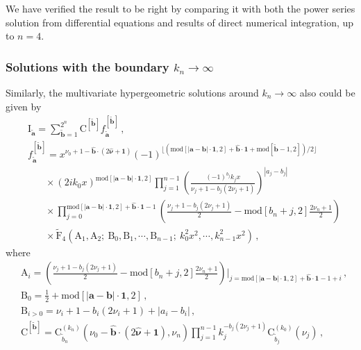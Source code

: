 \documentclass[a4paper,11pt]{article}
\newcommand{\nn}{\nonumber}
\begin{document}
We have verified the result to be right by comparing it with both the power series solution from differential equations and results of direct numerical integration, up to $n=4$.





\subsubsection{Solutions with the boundary $k_n\to\infty$}


Similarly, the multivariate hypergeometric solutions around $k_n\to \infty$ also could be given by
\begin{align}
&\text{I}_{\tilde{\bm{a}}}= \sum_{\tilde{\bm{b}}=1}^{2^n} \text{C}^{[\tilde{\bm{b}}]}f_{\tilde{\bm{a}}}^{[\tilde{\bm{b}}]}\, , \nn\\
&f_{\tilde{\bm{a}}}^{[\tilde{\bm{b}}]}=
x^{\nu_0+1-\hat{\bm{b}}\cdot (2\hat{\bm{\nu}}+\bm{1})}  (-1)^{\lfloor \left( \text{mod}[|\bm{a}-\bm{b}|\cdot \bm{1},2]+\hat{\bm{b}}\cdot \bm{1} +\text{mod}[\tilde{\bm{b}} - 1, 2]\right) / 2 \rfloor}  \nn\\
 &~~~~~~~~\times  (2 i k_0 x)^{\text{mod}[|\bm{a}-\bm{b}|\cdot \bm{1},2]} \prod_{j=1}^{n-1}
 \left( \frac{(-1)^{b_j} k_j x}{\nu_j+1-b_j(2\nu_j+1)} \right)^{|a_j-b_j|}     \nn\\
 &~~~~~~~~\times \prod_{j=0}^{\text{mod}[|\bm{a}-\bm{b}|\cdot \bm{1},2]+\hat{\bm{b}}\cdot \bm{1}-1} \left(       \frac{\nu_j+1-b_j(2\nu_j+1)}{2} - \text{mod}[b_n+j,2]\frac{2\nu_n+1}{2}  \right)      \nn\\
&~~~~~~~~\times\tilde{\text{F}}_4\left(\text{A}_1,\text{A}_2;~\text{B}_0,\text{B}_1,\cdots,\text{B}_{n-1};~k_0^2x^2,\cdots,k_{n-1}^2x^2\right) 
 \,  ,
\end{align}
where
 \begin{align}
 & \text{A}_i = \left(  \frac{\nu_j+1-b_j(2\nu_j+1)}{2} - \text{mod}[b_n+j,2]\frac{2\nu_n+1}{2}  \right)\Big|_{j=\text{mod}[|\bm{a}-\bm{b}|\cdot \bm{1},2]+\hat{\bm{b}}\cdot \bm{1}-1+i}       \, ,\nn\\
 & \text{B}_0 =\frac{1}{2}+\text{mod}[|\bm{a}-\bm{b}|\cdot \bm{1},2]        \, ,\nn\\
 &\text{B}_{i>0}=\nu_i+1-b_i(2\nu_i+1) +|a_i-b_i|        \,, \\
 &\text{C}^{[\tilde{\bm{b}}]} = \text{C}_{\tilde{b}_n}^{(k_n)}(\nu_0-\hat{\bm{b}}\cdot (2\hat{\bm{\nu}}+\bm{1}),\nu_n) \prod_{j=1}^{n-1} k_j^{-b_j(2\nu_j+1)} \text{C}_{\tilde{b}_j}^{(k_0)}(\nu_j) \, ,
\end{align}
\end{document}
